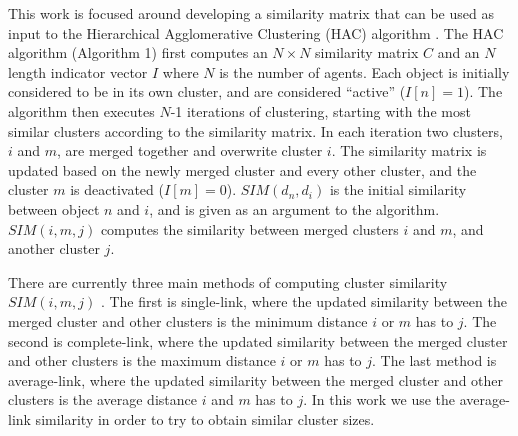 \documentclass[smallcondensed]{svjour3}
\begin{document}
This work is focused around developing a similarity matrix that can be used as input to the Hierarchical Agglomerative Clustering (HAC) algorithm \cite{Manning:2008:IIR:1394399,Agglomerative}. The HAC algorithm (Algorithm 1) first computes an $N\times N$ similarity matrix $C$ and an $N$ length indicator vector $I$ where $N$ is the number of agents. Each object is initially considered to be in its own cluster, and are considered ``active'' ($I[n] = 1$). The algorithm then executes $N$-1 iterations of clustering, starting with the most similar clusters according to the similarity matrix. In each iteration two clusters, $i$ and $m$, are merged together and overwrite cluster $i$. The similarity matrix is updated based on the newly merged cluster and every other cluster, and the cluster $m$ is deactivated ($I[m] = 0$). $SIM(d_n, d_i)$ is the initial similarity between object $n$ and $i$, and is given as an argument to the algorithm. $SIM(i,m,j)$ computes the similarity between merged clusters $i$ and $m$, and another cluster $j$.

There are currently three main methods of computing cluster similarity $SIM(i,m,j)$ \cite{Manning:2008:IIR:1394399}. The first is single-link, where the updated similarity between the merged cluster and other clusters is the minimum distance $i$ or $m$ has to $j$. The second is complete-link, where the updated similarity between the merged cluster and other clusters is the maximum distance $i$ or $m$ has to $j$. The last method is average-link, where the updated similarity between the merged cluster and other clusters is the average distance $i$ and $m$ has to $j$. In this work we use the average-link similarity in order to try to obtain similar cluster sizes.



\end{document}
